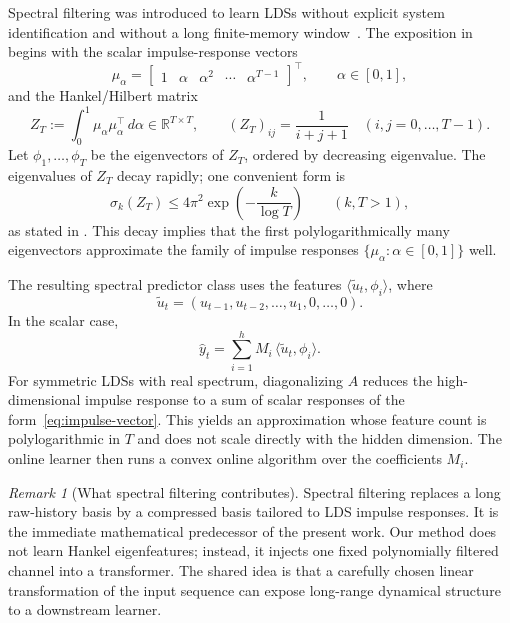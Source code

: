\documentclass[11pt]{article}
\theoremstyle{plain}
\theoremstyle{definition}
\theoremstyle{remark}
\newtheorem{remark}[theorem]{Remark}
\newcommand{\R}{\mathbb{R}}
\begin{document}
Spectral filtering was introduced to learn LDSs without explicit system identification and without a long finite-memory window~\citep{hazan2017learning}. The exposition in \citet[Ch.~11]{hazan2025onlinecontrol} begins with the scalar impulse-response vectors
\begin{equation}
    \mu_\alpha
    =
    \begin{bmatrix}
    1 & \alpha & \alpha^2 & \cdots & \alpha^{T-1}
    \end{bmatrix}^{\!\top},
    \qquad \alpha \in [0,1],
    \label{eq:impulse-vector}
\end{equation}
and the Hankel/Hilbert matrix
\begin{equation}
    Z_T
    :=
    \int_0^1 \mu_\alpha\mu_\alpha^\top\,d\alpha
    \in \R^{T\times T},
    \qquad
    (Z_T)_{ij}=\frac{1}{i+j+1}
    \quad (i,j=0,\ldots,T-1).
    \label{eq:hankel-matrix}
\end{equation}
Let $\phi_1,\ldots,\phi_T$ be the eigenvectors of $Z_T$, ordered by decreasing eigenvalue. The eigenvalues of $Z_T$ decay rapidly; one convenient form is
\begin{equation}
    \sigma_k(Z_T) \le 4\pi^2 \exp\!\left(-\frac{k}{\log T}\right)
    \qquad (k,T>1),
    \label{eq:hankel-decay}
\end{equation}
as stated in \citet[Thm.~11.1]{hazan2025onlinecontrol}. This decay implies that the first polylogarithmically many eigenvectors approximate the family of impulse responses $\{\mu_\alpha:\alpha\in[0,1]\}$ well.

The resulting spectral predictor class uses the features $\langle \tilde u_t,\phi_i\rangle$, where
\[
    \tilde u_t=(u_{t-1},u_{t-2},\ldots,u_1,0,\ldots,0).
\]
In the scalar case,
\begin{equation}
    \hat y_t
    =
    \sum_{i=1}^{h} M_i\, \langle \tilde u_t,\phi_i\rangle.
    \label{eq:spectral-predictor}
\end{equation}
For symmetric LDSs with real spectrum, diagonalizing $A$ reduces the high-dimensional impulse response to a sum of scalar responses of the form~\eqref{eq:impulse-vector}. This yields an approximation whose feature count is polylogarithmic in $T$ and does not scale directly with the hidden dimension. The online learner then runs a convex online algorithm over the coefficients $M_i$.

\begin{remark}[What spectral filtering contributes]
Spectral filtering replaces a long raw-history basis by a compressed basis tailored to LDS impulse responses. It is the immediate mathematical predecessor of the present work. Our method does not learn Hankel eigenfeatures; instead, it injects one fixed polynomially filtered channel into a transformer. The shared idea is that a carefully chosen linear transformation of the input sequence can expose long-range dynamical structure to a downstream learner.
\end{remark}
\end{document}
